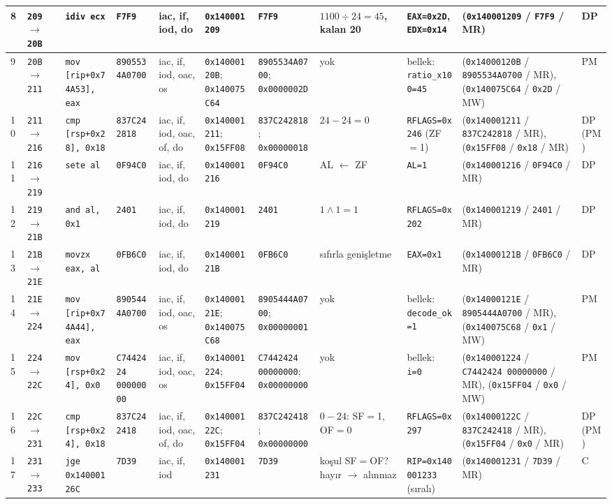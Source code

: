 \documentclass[11pt,a4paper]{article}
\newcommand{\tl}{\texttt}
\begin{document}
\begin{landscape}
{\begin{longtable}{|p{0.35cm}|p{1.95cm}|p{3.0cm}|p{1.85cm}|p{1.6cm}|p{1.9cm}|p{2.1cm}|p{2.3cm}|p{2.0cm}|p{4.2cm}|p{0.9cm}|}
\hline
8 & \tl{209} $\to$ \tl{20B} & \tl{idiv ecx} & \tl{F7F9} & iac, if, iod, do & \tl{0x140001209} & \tl{F7F9} & $1100 \div 24 = 45$, kalan 20 & \tl{EAX=0x2D}, \tl{EDX=0x14} & (\tl{0x140001209} / \tl{F7F9} / MR) & DP\\
\hline
9 & \tl{20B} $\to$ \tl{211} & \tl{mov [rip+0x74A53], eax} & \tl{8905534A0700} & iac, if, iod, oac, os & \tl{0x14000120B}; \tl{0x140075C64} & \tl{8905534A0700}; \tl{0x0000002D} & yok & bellek: \tl{ratio\_x100=45} & (\tl{0x14000120B} / \tl{8905534A0700} / MR), (\tl{0x140075C64} / \tl{0x2D} / MW) & PM\\
\hline
10 & \tl{211} $\to$ \tl{216} & \tl{cmp [rsp+0x28], 0x18} & \tl{837C242818} & iac, if, iod, oac, of, do & \tl{0x140001211}; \tl{0x15FF08} & \tl{837C242818}; \tl{0x00000018} & $24 - 24 = 0$ & \tl{RFLAGS=0x246} (ZF$=$1) & (\tl{0x140001211} / \tl{837C242818} / MR), (\tl{0x15FF08} / \tl{0x18} / MR) & DP (PM)\\
\hline
11 & \tl{216} $\to$ \tl{219} & \tl{sete al} & \tl{0F94C0} & iac, if, iod, do & \tl{0x140001216} & \tl{0F94C0} & AL $\leftarrow$ ZF & \tl{AL=1} & (\tl{0x140001216} / \tl{0F94C0} / MR) & DP\\
\hline
12 & \tl{219} $\to$ \tl{21B} & \tl{and al, 0x1} & \tl{2401} & iac, if, iod, do & \tl{0x140001219} & \tl{2401} & $1 \wedge 1 = 1$ & \tl{RFLAGS=0x202} & (\tl{0x140001219} / \tl{2401} / MR) & DP\\
\hline
13 & \tl{21B} $\to$ \tl{21E} & \tl{movzx eax, al} & \tl{0FB6C0} & iac, if, iod, do & \tl{0x14000121B} & \tl{0FB6C0} & sıfırla genişletme & \tl{EAX=0x1} & (\tl{0x14000121B} / \tl{0FB6C0} / MR) & DP\\
\hline
14 & \tl{21E} $\to$ \tl{224} & \tl{mov [rip+0x74A44], eax} & \tl{8905444A0700} & iac, if, iod, oac, os & \tl{0x14000121E}; \tl{0x140075C68} & \tl{8905444A0700}; \tl{0x00000001} & yok & bellek: \tl{decode\_ok=1} & (\tl{0x14000121E} / \tl{8905444A0700} / MR), (\tl{0x140075C68} / \tl{0x1} / MW) & PM\\
\hline
15 & \tl{224} $\to$ \tl{22C} & \tl{mov [rsp+0x24], 0x0} & \tl{C7442424 00000000} & iac, if, iod, oac, os & \tl{0x140001224}; \tl{0x15FF04} & \tl{C7442424 00000000}; \tl{0x00000000} & yok & bellek: \tl{i=0} & (\tl{0x140001224} / \tl{C7442424 00000000} / MR), (\tl{0x15FF04} / \tl{0x0} / MW) & PM\\
\hline
16 & \tl{22C} $\to$ \tl{231} & \tl{cmp [rsp+0x24], 0x18} & \tl{837C242418} & iac, if, iod, oac, of, do & \tl{0x14000122C}; \tl{0x15FF04} & \tl{837C242418}; \tl{0x00000000} & $0 - 24$: SF$=$1, OF$=$0 & \tl{RFLAGS=0x297} & (\tl{0x14000122C} / \tl{837C242418} / MR), (\tl{0x15FF04} / \tl{0x0} / MR) & DP (PM)\\
\hline
17 & \tl{231} $\to$ \tl{233} & \tl{jge 0x14000126C} & \tl{7D39} & iac, if, iod & \tl{0x140001231} & \tl{7D39} & koşul SF$=$OF? hayır $\to$ alınmaz & \tl{RIP=0x140001233} (sıralı) & (\tl{0x140001231} / \tl{7D39} / MR) & C\\
\hline
\end{longtable}
}
\end{landscape}
\end{document}
